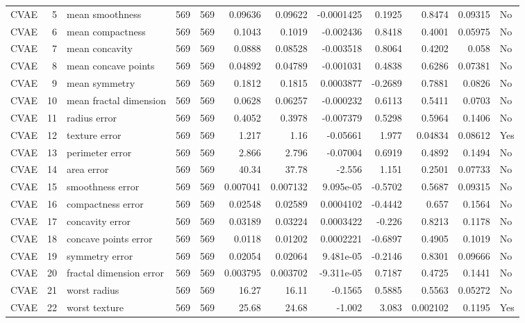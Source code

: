 \begin{longtable}{lrp{}rrrrrrrrl}
CVAE & 5 & mean smoothness & 569 & 569 & 0.09636 & 0.09622 & -0.0001425 & 0.1925 & 0.8474 & 0.09315 & No \\
CVAE & 6 & mean compactness & 569 & 569 & 0.1043 & 0.1019 & -0.002436 & 0.8418 & 0.4001 & 0.05975 & No \\
CVAE & 7 & mean concavity & 569 & 569 & 0.0888 & 0.08528 & -0.003518 & 0.8064 & 0.4202 & 0.058 & No \\
CVAE & 8 & mean concave points & 569 & 569 & 0.04892 & 0.04789 & -0.001031 & 0.4838 & 0.6286 & 0.07381 & No \\
CVAE & 9 & mean symmetry & 569 & 569 & 0.1812 & 0.1815 & 0.0003877 & -0.2689 & 0.7881 & 0.0826 & No \\
CVAE & 10 & mean fractal dimension & 569 & 569 & 0.0628 & 0.06257 & -0.000232 & 0.6113 & 0.5411 & 0.0703 & No \\
CVAE & 11 & radius error & 569 & 569 & 0.4052 & 0.3978 & -0.007379 & 0.5298 & 0.5964 & 0.1406 & No \\
CVAE & 12 & texture error & 569 & 569 & 1.217 & 1.16 & -0.05661 & 1.977 & 0.04834 & 0.08612 & Yes \\
CVAE & 13 & perimeter error & 569 & 569 & 2.866 & 2.796 & -0.07004 & 0.6919 & 0.4892 & 0.1494 & No \\
CVAE & 14 & area error & 569 & 569 & 40.34 & 37.78 & -2.556 & 1.151 & 0.2501 & 0.07733 & No \\
CVAE & 15 & smoothness error & 569 & 569 & 0.007041 & 0.007132 & 9.095e-05 & -0.5702 & 0.5687 & 0.09315 & No \\
CVAE & 16 & compactness error & 569 & 569 & 0.02548 & 0.02589 & 0.0004102 & -0.4442 & 0.657 & 0.1564 & No \\
CVAE & 17 & concavity error & 569 & 569 & 0.03189 & 0.03224 & 0.0003422 & -0.226 & 0.8213 & 0.1178 & No \\
CVAE & 18 & concave points error & 569 & 569 & 0.0118 & 0.01202 & 0.0002221 & -0.6897 & 0.4905 & 0.1019 & No \\
CVAE & 19 & symmetry error & 569 & 569 & 0.02054 & 0.02064 & 9.481e-05 & -0.2146 & 0.8301 & 0.09666 & No \\
CVAE & 20 & fractal dimension error & 569 & 569 & 0.003795 & 0.003702 & -9.311e-05 & 0.7187 & 0.4725 & 0.1441 & No \\
CVAE & 21 & worst radius & 569 & 569 & 16.27 & 16.11 & -0.1565 & 0.5885 & 0.5563 & 0.05272 & No \\
CVAE & 22 & worst texture & 569 & 569 & 25.68 & 24.68 & -1.002 & 3.083 & 0.002102 & 0.1195 & Yes \\

\end{longtable}
